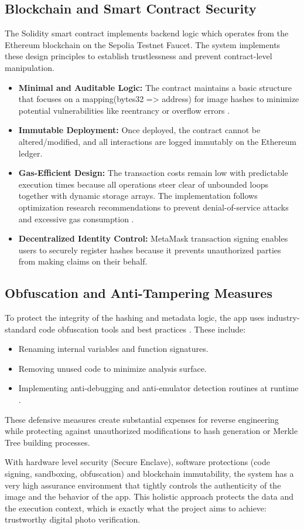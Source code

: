 \subsection{Blockchain and Smart Contract Security}
The Solidity smart contract implements backend logic which operates from the Ethereum blockchain on the Sepolia Testnet Faucet. 
The system implements these design principles to establish trustlessness and prevent contract-level manipulation.

\begin{itemize}
    \item {\textbf{Minimal and Auditable Logic:}} The contract maintains a basic structure that focuses on a mapping(bytes32 => address) for image hashes to minimize potential vulnerabilities like reentrancy or overflow errors \cite{cheng2020}.
    \item {\textbf{Immutable Deployment:}} Once deployed, the contract cannot be altered/modified, and all interactions are logged immutably on the Ethereum ledger.
    \item {\textbf{Gas-Efficient Design:}} The transaction costs remain low with predictable execution times because all operations steer clear of unbounded loops together with dynamic storage arrays. The implementation follows optimization research recommendations to prevent denial-of-service attacks and excessive gas consumption \cite{chunmiao2021} \cite{Nguyen2022GasSaverAT}.
    \item {\textbf{Decentralized Identity Control:}} MetaMask transaction signing enables users to securely register hashes because it prevents unauthorized parties from making claims on their behalf.
\end{itemize}

\subsection{Obfuscation and Anti-Tampering Measures}
To protect the integrity of the hashing and metadata logic, the app uses industry-standard code obfuscation tools and best practices \cite{wandCodeObfuscation}. These include:

\begin{itemize}
    \item Renaming internal variables and function signatures.
    \item Removing unused code to minimize analysis surface.
    \item Implementing anti-debugging and anti-emulator detection routines at runtime .
\end{itemize}

These defensive measures create substantial expenses for reverse engineering while protecting against unauthorized modifications to hash generation or Merkle Tree building processes.


With hardware level security (Secure Enclave), software protections (code signing, sandboxing, obfuscation) and blockchain immutability, the system has a very high assurance environment that tightly controls the authenticity of the image and the behavior of the app. This holistic approach protects the data and the execution context, which is exactly what the project aims to achieve: trustworthy digital photo verification.